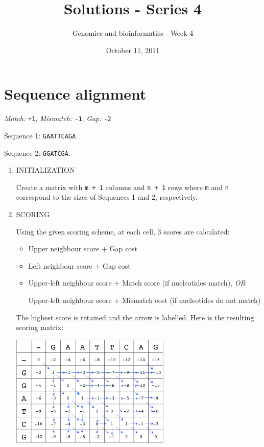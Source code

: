 \documentclass[english, a4paper,11pt]{article}
\title{Solutions - Series 4}
\date{October 11, 2011}
\author{Genomics and bioinformatics - Week 4}
\begin{document}
\maketitle

\section{Sequence alignment}

\emph{Match:}  \texttt{+1}, \emph{Mismatch:} \texttt{-1}, \emph{Gap:} \texttt{-2}

Sequence 1: \texttt{GAATTCAGA}

Sequence 2: \texttt{GGATCGA}.\\

\begin{enumerate}
\item INITIALIZATION

Create a matrix with \texttt{m + 1} columns and \texttt{n + 1} rows where \texttt{m} and \texttt{n} correspond to the sizes of Sequences 1 and 2, respectively. \\


\item SCORING

Using the given scoring scheme, at each cell, 3 scores are calculated:
\begin{itemize}
\item Upper neighbour score + Gap cost
\item Left neighbour score + Gap cost
\item Upper-left neighbour score + Match score (if nucleotides match), \emph{OR} 

Upper-left neighbour score + Mismatch cost (if nucleotides do not match)
\end{itemize}

The highest score is retained and the arrow is labelled. Here is the resulting scoring matrix: \\

\begin{center}
\includegraphics[width=0.6\textwidth]{scoring.png}\\
\end{center}


\end{enumerate}
\end{document}
